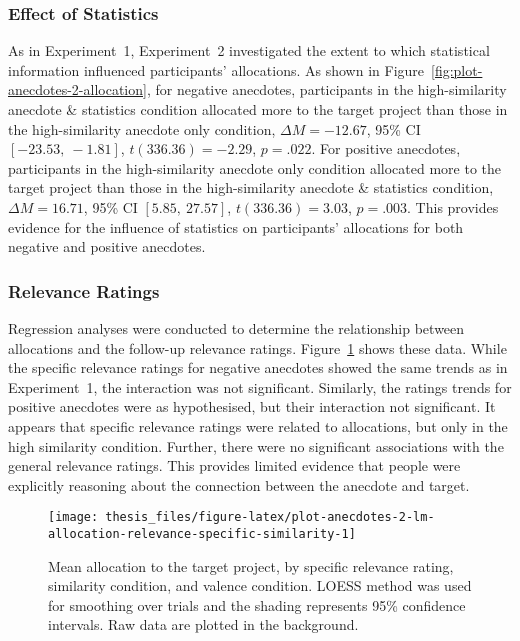 \documentclass[a4paper, nobind]{templates/ociamthesis}
\theoremstyle{definition}
\theoremstyle{definition}
\theoremstyle{definition}
\theoremstyle{definition}
\theoremstyle{remark}
\begin{document}
\subsubsection{Effect of Statistics}

As in Experiment~1, Experiment~2 investigated the extent to which statistical
information influenced participants' allocations. As shown in
Figure~\ref{fig:plot-anecdotes-2-allocation}, for negative anecdotes,
participants in the high-similarity anecdote \& statistics condition allocated
more to the target project than those in the high-similarity anecdote only
condition,
\(\Delta M = -12.67\), 95\% CI \([-23.53,~-1.81]\), \(t(336.36) = -2.29\), \(p = .022\).
For positive anecdotes, participants in the high-similarity anecdote only
condition allocated more to the target project than those in the high-similarity
anecdote \& statistics condition,
\(\Delta M = 16.71\), 95\% CI \([5.85,~27.57]\), \(t(336.36) = 3.03\), \(p = .003\).
This provides evidence for the influence of statistics on participants'
allocations for both negative and positive anecdotes.

\subsubsection{Relevance Ratings}

Regression analyses were conducted to determine the relationship between
allocations and the follow-up relevance ratings.
Figure~\ref{fig:plot-anecdotes-2-lm-allocation-relevance-specific-similarity}
shows these data. While the specific relevance ratings for negative anecdotes
showed the same trends as in Experiment~1, the interaction was not significant.
Similarly, the ratings trends for positive anecdotes were as hypothesised, but
their interaction not significant. It appears that specific relevance ratings
were related to allocations, but only in the high similarity condition. Further,
there were no significant associations with the general relevance ratings. This
provides limited evidence that people were explicitly reasoning about the
connection between the anecdote and target.



\begin{figure}
\texttt{[image: thesis\_files/figure-latex/plot-anecdotes-2-lm-allocation-relevance-specific-similarity-1]} \caption{Mean allocation to the target project, by specific relevance rating, similarity condition, and valence condition. LOESS method was used for smoothing over trials and the shading represents 95\% confidence intervals. Raw data are plotted in the background.}\label{fig:plot-anecdotes-2-lm-allocation-relevance-specific-similarity}
\end{figure}
\end{document}
